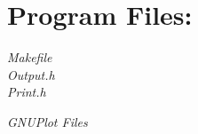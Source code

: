 \documentclass[12pt]{article}
\theoremstyle{definition}
\begin{document}
\section*{Program Files:}
\emph{Makefile}\\

\emph{Output.h}\\

\emph{Print.h}

\emph{GNUPlot Files}\\


\end{document}
